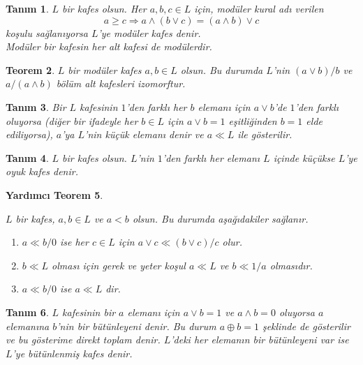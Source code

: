 \documentclass[a4paper,12pt]{article}
\numberwithin{equation}{section}
\theoremstyle{italik}
\newtheorem{teorem}{Teorem}[section]
\newtheorem{lemma}[teorem]{Yardımcı Teorem}
\newtheorem{tanim}[teorem]{Tanım}
\begin{document}
\begin{tanim}

     $ L $ bir kafes olsun. Her $ a,b,c \in L $ için, \textit{modüler kural} adı verilen
     \[
     a \geq c \Rightarrow a \wedge ( b \vee c ) = ( a \wedge b ) \vee c 
     \]
     koşulu sağlanıyorsa $ L $'ye \textit{modüler kafes} denir. \\
     \indent Modüler bir kafesin her alt kafesi de modülerdir.
\end{tanim}

\begin{teorem}  \autocite[Teorem 1.5]{calugeranu}
     $ L $ bir modüler kafes $ a,b \in L $ olsun. Bu durumda $ L $'nin $ (a \vee b)/b $ ve $ a/(a \wedge b ) $ bölüm alt kafesleri 
     izomorftur.
\end{teorem}

\begin{tanim}
     Bir $ L $ kafesinin $ 1 $'den farklı her $ b $ elemanı için $ a \vee b $'de $ 1 $'den
     farklı oluyorsa (diğer bir ifadeyle her $ b \in L $ için $ a \vee b = 1 $ eşitliğinden $ b = 1 $ elde ediliyorsa), 
     $ a $'ya $ L $'nin \textit{küçük elemanı} denir ve $ a \ll L $ ile gösterilir.
\end{tanim}
\begin{tanim}
    $ L $ bir kafes olsun. $ L $'nin $ 1 $'den farklı her elemanı $ L $ içinde küçükse $ L $'ye \textit{oyuk kafes} denir.
\end{tanim}
\begin{lemma} \autocite[Lemma 2.2]{refail}

         $ L $ bir kafes, $ a,b \in L $ ve $ a < b $ olsun. Bu durumda aşağıdakiler sağlanır.
          \begin{enumerate}[label=(\roman{*}), ref=(\roman{*})]

               \itemsep 0em
               \item $ a \ll b/0 $ ise her $ c \in L $ için $ a \vee c \ll (b \vee c)/c $ olur.
               \item $ b \ll L $ olması için gerek ve yeter koşul $ a \ll L $ ve $ b \ll 1/a $ olmasıdır. 
               \item $ a \ll b/0 $ ise $ a \ll L $ dir. 
          \end{enumerate}
     \end{lemma}

\begin{tanim}
     $ L $ kafesinin bir $ a $ elemanı için $ a \vee b = 1 $ ve $ a \wedge b = 0 $ oluyorsa
     $ a $ elemanına $ b $'nin bir \textit{bütünleyeni} denir. Bu durum $ a \oplus b = 1 $ şeklinde de gösterilir ve bu gösterime 
	\textit{direkt toplam} denir. $ L $'deki her elemanın bir bütünleyeni var 
     ise $ L $'ye \textit{bütünlenmiş kafes} denir.
\end{tanim}
\end{document}
